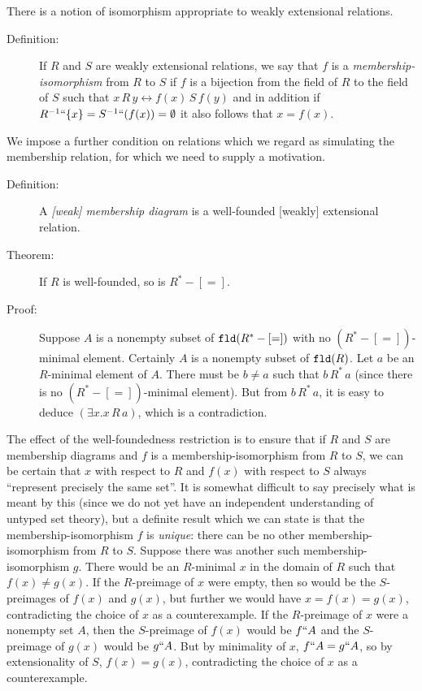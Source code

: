 \documentclass[12pt]{book}
\begin{document}
There is a notion of isomorphism appropriate to weakly extensional
relations.

\begin{description}

\item[Definition:] If $R$ and $S$ are weakly extensional relations, we
say that $f$ is a {\em membership-isomorphism\/} from $R$ to $S$ if
$f$ is a bijection from the field of $R$ to the field of $S$ such that
$x\,R\,y \leftrightarrow f(x)\,S\,f(y)$ and in addition if
$R^{-1}``\{x\} = S^{-1}``(f(x)) = \emptyset$ it also follows that
$x=f(x)$.

\end{description}

We impose a further condition on relations which we regard as
simulating the membership relation, for which we need to supply a
motivation.

\begin{description}

\item[Definition:] A {\em [weak] membership diagram\/} is a
well-founded [weakly] extensional relation.

\item[Theorem:]  If $R$ is well-founded, so is $R^*-[=]$.

\item[Proof:] Suppose $A$ is a nonempty subset of ${\tt fld}(R^*-[=])$
with no $(R^*-[=])$-minimal element.  Certainly $A$ is a nonempty
subset of ${\tt fld}(R)$.  Let $a$ be an $R$-minimal element of $A$.
There must be $b \neq a$ such that $b \, R^* \, a$ (since there is no
$(R^*-[=])$-minimal element).  But from $b \, R^* \, a$, it is easy to
deduce $(\exists x.x \,R\,a)$, which is a contradiction.

\end{description}

The effect of the well-foundedness restriction is to ensure that if
$R$ and $S$ are membership diagrams and $f$ is a
membership-isomorphism from $R$ to $S$, we can be certain that $x$
with respect to $R$ and $f(x)$ with respect to $S$ always ``represent
precisely the same set''.  It is somewhat difficult to say precisely
what is meant by this (since we do not yet have an independent
understanding of untyped set theory), but a definite result which we
can state is that the membership-isomorphism $f$ is {\em unique\/}:
there can be no other membership-isomorphism from $R$ to $S$.  Suppose
there was another such membership-isomorphism $g$.  There would be an
$R$-minimal $x$ in the domain of $R$ such that $f(x) \neq g(x)$.  If
the $R$-preimage of $x$ were empty, then so would be the $S$-preimages
of $f(x)$ and $g(x)$, but further we would have $x=f(x)=g(x)$,
contradicting the choice of $x$ as a counterexample.  If the
$R$-preimage of $x$ were a nonempty set $A$, then the $S$-preimage of
$f(x)$ would be $f``A$ and the $S$-preimage of $g(x)$ would be $g``A$.
But by minimality of $x$, $f``A = g``A$, so by extensionality of $S$,
$f(x)=g(x)$, contradicting the choice of $x$ as a counterexample.
\end{document}
